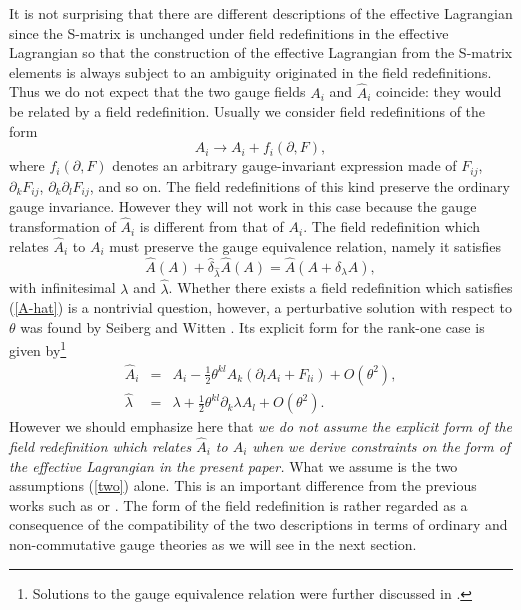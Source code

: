 \documentclass[a4paper,12pt]{article}
\begin{document}
It is not surprising that there are different descriptions
of the effective Lagrangian
since the S-matrix is unchanged under field redefinitions
in the effective Lagrangian so that
the construction of the effective Lagrangian from
the S-matrix elements is always subject to an ambiguity
originated in the field redefinitions.
Thus we do not expect that the two gauge fields $A_i$ and $\hat{A}_i$
coincide: they would be related by a field redefinition.
Usually we consider field redefinitions of the form
$$
A_i \rightarrow A_i + f_i (\partial,F),
$$
where $f_i (\partial,F)$ denotes an arbitrary gauge-invariant
expression made of $F_{ij}$, $\partial_k F_{ij}$,
$\partial_k \partial_l F_{ij}$, and so on.
The field redefinitions of this kind
preserve the ordinary gauge invariance.
However they will not work in this case because
the gauge transformation
of $\hat{A}_i$ is different from that of $A_i$.
The field redefinition which relates $\hat{A}_i$ to $A_i$
must preserve the gauge equivalence relation,
namely it satisfies
\begin{equation}
\hat{A} (A) + \hat{\delta}_{\hat{\lambda}} \hat{A} (A)
= \hat{A} ( A + \delta_\lambda A ),
\label{A-hat}
\end{equation}
with infinitesimal $\lambda$ and $\hat{\lambda}$.
Whether there exists a field redefinition which satisfies
(\ref{A-hat}) is a nontrivial question,
however, a perturbative solution with respect to $\theta$
was found by Seiberg and Witten \cite{SW}.
Its explicit form for the rank-one case
is given by\footnote{
Solutions to the gauge equivalence relation
were further discussed in \cite{AK}.
}
\begin{eqnarray}
\hat{A}_i &=& A_i - \frac{1}{2} \theta^{kl}
A_k (\partial_l A_i + F_{li}) + O(\theta^2),
\label{A-hat-2} \\
\hat{\lambda} &=& \lambda + \frac{1}{2} \theta^{kl}
\partial_k \lambda A_l + O(\theta^2).
\end{eqnarray}
However we should emphasize here that
{\em we do not assume the explicit form of
the field redefinition which relates $\hat{A}_i$ to $A_i$
when we derive constraints on the form of the effective Lagrangian
in the present paper.}
What we assume is the two assumptions (\ref{two}) alone.
This is an important difference from the previous works
such as \cite{SW} or \cite{Okawa}.
The form of the field redefinition is
rather regarded as a consequence of the compatibility
of the two descriptions in terms of ordinary and non-commutative
gauge theories as we will see in the next section.
\end{document}
